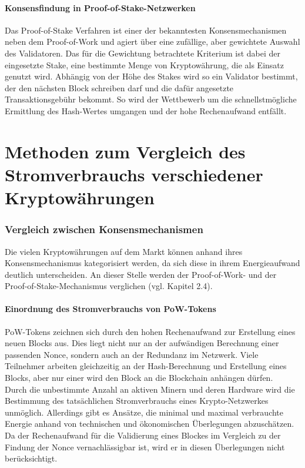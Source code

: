 \documentclass[12pt]{article}
\begin{document}
\subsection{Konsensfindung in Proof-of-Stake-Netzwerken}
Das Proof-of-Stake Verfahren ist einer der bekanntesten Konsensmechanismen neben dem Proof-of-Work und agiert über eine zufällige, aber gewichtete Auswahl des Validatoren. Das für die Gewichtung betrachtete Kriterium ist dabei der eingesetzte Stake, eine bestimmte Menge von Kryptowährung, die als Einsatz genutzt wird. Abhängig von der Höhe des Stakes wird so ein Validator bestimmt, der den nächsten Block schreiben darf und die dafür angesetzte Transaktionsgebühr bekommt. So wird der Wettbewerb um die schnellstmögliche Ermittlung des Hash-Wertes umgangen und der hohe Rechenaufwand entfällt.

\part{Methoden zum Vergleich des Stromverbrauchs verschiedener Kryptowährungen}

\section{Vergleich zwischen Konsensmechanismen}
Die vielen Kryptowährungen auf dem Markt können anhand ihres Konsensmechanismus kategorisiert werden, da sich diese in ihrem Energieaufwand deutlich unterscheiden. An dieser Stelle werden der Proof-of-Work- und der Proof-of-Stake-Mechanismus verglichen (vgl. Kapitel 2.4).
\subsection{Einordnung des Stromverbrauchs von PoW-Tokens}
PoW-Tokens zeichnen sich durch den hohen Rechenaufwand zur Erstellung eines neuen Blocks aus. Dies liegt nicht nur an der aufwändigen Berechnung einer passenden Nonce, sondern auch an der Redundanz im Netzwerk. Viele Teilnehmer arbeiten gleichzeitig an der Hash-Berechnung und Erstellung eines Blocks, aber nur einer wird den Block an die Blockchain anhängen dürfen.\\
Durch die unbestimmte Anzahl an aktiven Minern und deren Hardware wird die Bestimmung des tatsächlichen Stromverbrauchs eines Krypto-Netzwerkes unmöglich. Allerdings gibt es Ansätze, die minimal und maximal verbrauchte Energie anhand von technischen und ökonomischen Überlegungen abzuschätzen. Da der Rechenaufwand für die Validierung eines Blockes im Vergleich zu der Findung der Nonce vernachlässigbar ist, wird er in diesen Überlegungen nicht berücksichtigt.
\end{document}
